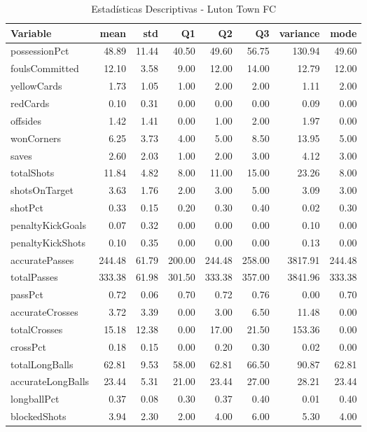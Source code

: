 \begin{table}[H]
\centering
\caption{Estadísticas Descriptivas - Luton Town FC}
\label{tab:eng_luton}
\small
\begin{tabular}{lrrrrrrr}
\hline
Variable & mean & std & Q1 & Q2 & Q3 & variance & mode \\
\hline
possessionPct & 48.89 & 11.44 & 40.50 & 49.60 & 56.75 & 130.94 & 49.60 \\
foulsCommitted & 12.10 & 3.58 & 9.00 & 12.00 & 14.00 & 12.79 & 12.00 \\
yellowCards & 1.73 & 1.05 & 1.00 & 2.00 & 2.00 & 1.11 & 2.00 \\
redCards & 0.10 & 0.31 & 0.00 & 0.00 & 0.00 & 0.09 & 0.00 \\
offsides & 1.42 & 1.41 & 0.00 & 1.00 & 2.00 & 1.97 & 0.00 \\
wonCorners & 6.25 & 3.73 & 4.00 & 5.00 & 8.50 & 13.95 & 5.00 \\
saves & 2.60 & 2.03 & 1.00 & 2.00 & 3.00 & 4.12 & 3.00 \\
totalShots & 11.84 & 4.82 & 8.00 & 11.00 & 15.00 & 23.26 & 8.00 \\
shotsOnTarget & 3.63 & 1.76 & 2.00 & 3.00 & 5.00 & 3.09 & 3.00 \\
shotPct & 0.33 & 0.15 & 0.20 & 0.30 & 0.40 & 0.02 & 0.30 \\
penaltyKickGoals & 0.07 & 0.32 & 0.00 & 0.00 & 0.00 & 0.10 & 0.00 \\
penaltyKickShots & 0.10 & 0.35 & 0.00 & 0.00 & 0.00 & 0.13 & 0.00 \\
accuratePasses & 244.48 & 61.79 & 200.00 & 244.48 & 258.00 & 3817.91 & 244.48 \\
totalPasses & 333.38 & 61.98 & 301.50 & 333.38 & 357.00 & 3841.96 & 333.38 \\
passPct & 0.72 & 0.06 & 0.70 & 0.72 & 0.76 & 0.00 & 0.70 \\
accurateCrosses & 3.72 & 3.39 & 0.00 & 3.00 & 6.50 & 11.48 & 0.00 \\
totalCrosses & 15.18 & 12.38 & 0.00 & 17.00 & 21.50 & 153.36 & 0.00 \\
crossPct & 0.18 & 0.15 & 0.00 & 0.20 & 0.30 & 0.02 & 0.00 \\
totalLongBalls & 62.81 & 9.53 & 58.00 & 62.81 & 66.50 & 90.87 & 62.81 \\
accurateLongBalls & 23.44 & 5.31 & 21.00 & 23.44 & 27.00 & 28.21 & 23.44 \\
longballPct & 0.37 & 0.08 & 0.30 & 0.37 & 0.40 & 0.01 & 0.40 \\
blockedShots & 3.94 & 2.30 & 2.00 & 4.00 & 6.00 & 5.30 & 4.00 \\

\end{tabular}
\end{table}
